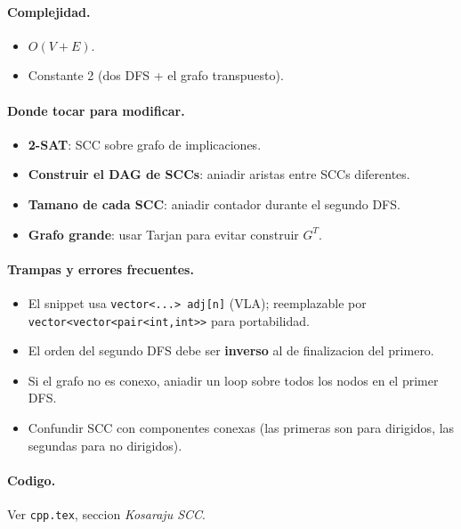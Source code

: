\paragraph{Complejidad.}
\begin{itemize}\setlength\itemsep{0pt}
	\item $O(V + E)$.
	\item Constante 2 (dos DFS + el grafo transpuesto).
\end{itemize}

\paragraph{Donde tocar para modificar.}
\begin{itemize}\setlength\itemsep{0pt}
	\item \textbf{2-SAT}: SCC sobre grafo de implicaciones.
	\item \textbf{Construir el DAG de SCCs}: aniadir aristas entre SCCs diferentes.
	\item \textbf{Tamano de cada SCC}: aniadir contador durante el segundo DFS.
	\item \textbf{Grafo grande}: usar Tarjan para evitar construir $G^T$.
\end{itemize}

\paragraph{Trampas y errores frecuentes.}
\begin{itemize}\setlength\itemsep{0pt}
	\item El snippet usa \texttt{vector<...> adj[n]} (VLA); reemplazable por \texttt{vector<vector<pair<int,int>>} para portabilidad.
	\item El orden del segundo DFS debe ser \textbf{inverso} al de finalizacion del primero.
	\item Si el grafo no es conexo, aniadir un loop sobre todos los nodos en el primer DFS.
	\item Confundir SCC con componentes conexas (las primeras son para dirigidos, las segundas para no dirigidos).
\end{itemize}

\paragraph{Codigo.}
Ver \texttt{cpp.tex}, seccion \textit{Kosaraju SCC}.

\vspace{0.5em}
